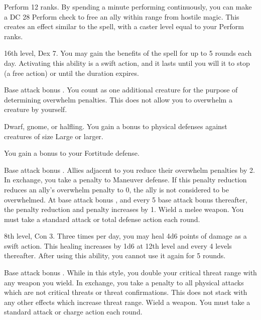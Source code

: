 \featpre Perform 12 ranks.
\featben By spending a minute performing continuously, you can make a DC 28 Perform check to free an ally within \rngmed range from hostile magic. This creates an effect similar to the  spell, with a caster level equal to your Perform ranks.

\featpre 16th level, Dex 7.
\featben You may gain the benefits of the  spell for up to 5 rounds each day. Activating this ability is a swift action, and it lasts until you will it to stop (a free action) or until the duration expires.

\featpre Base attack bonus .
\featben You count as one additional creature for the purpose of determining overwhelm penalties. This does not allow you to overwhelm a creature by yourself.

 Dwarf, gnome, or halfling.
 You gain a  bonus to physical defenses against creatures of size Large or larger.

 You gain a  bonus to your Fortitude defense.

\featpre Base attack bonus .
 Allies adjacent to you reduce their overwhelm penalties by 2. In exchange, you take a  penalty to Maneuver defense. If this penalty reduction reduces an ally's overwhelm penalty to 0, the ally is not considered to be overwhelmed. At base attack bonus , and every 5 base attack bonus thereafter, the penalty reduction and penalty increases by 1.
\stylereq Wield a melee weapon. You must take a standard attack or total defense action each round.

\featpre 8th level, Con 3.
\featben Three times per day, you may heal 4d6 points of damage as a swift action. This healing increases by 1d6 at 12th level and every 4 levels thereafter. After using this ability, you cannot use it again for 5 rounds.

 Base attack bonus .
 While in this style, you double your critical threat range with any weapon you wield. In exchange, you take a  penalty to all physical attacks which are not critical threats or threat confirmations. This does not stack with any other effects which increase threat range.
\stylereq Wield a weapon. You must take a standard attack or charge action each round.

